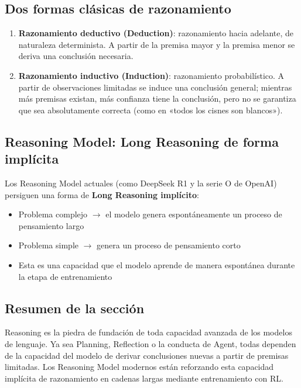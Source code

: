 \subsection{Dos formas clásicas de razonamiento}

\begin{enumerate}
    \item \textbf{Razonamiento deductivo (Deduction)}: razonamiento hacia adelante, de naturaleza determinista. A partir de la premisa mayor y la premisa menor se deriva una conclusión necesaria.
    \item \textbf{Razonamiento inductivo (Induction)}: razonamiento probabilístico. A partir de observaciones limitadas se induce una conclusión general; mientras más premisas existan, más confianza tiene la conclusión, pero no se garantiza que sea absolutamente correcta (como en «todos los cisnes son blancos»).
\end{enumerate}

\subsection{Reasoning Model: Long Reasoning de forma implícita}

Los Reasoning Model actuales (como DeepSeek R1 y la serie O de OpenAI) persiguen una forma de \textbf{Long Reasoning implícito}:
\begin{itemize}
    \item Problema complejo $\rightarrow$ el modelo genera espontáneamente un proceso de pensamiento largo
    \item Problema simple $\rightarrow$ genera un proceso de pensamiento corto
    \item Esta es una capacidad que el modelo aprende de manera espontánea durante la etapa de entrenamiento
\end{itemize}

\subsection{Resumen de la sección}

Reasoning es la piedra de fundación de toda capacidad avanzada de los modelos de lenguaje. Ya sea Planning, Reflection o la conducta de Agent, todas dependen de la capacidad del modelo de derivar conclusiones nuevas a partir de premisas limitadas. Los Reasoning Model modernos están reforzando esta capacidad implícita de razonamiento en cadenas largas mediante entrenamiento con RL.

